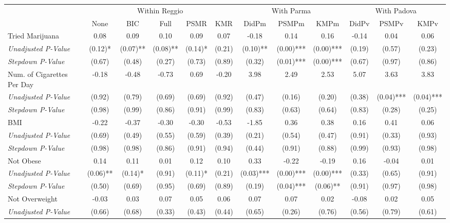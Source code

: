 \begin{tabular}{l c c c c c c c c c c c}
\toprule
& \multicolumn{5}{c}{Within Reggio} & \multicolumn{3}{c}{With Parma} & \multicolumn{3}{c}{With Padova} \\\cmidrule(lr){2-6} \cmidrule(lr){7-9} \cmidrule(lr){10-12}
 & None & BIC & Full & PSMR & KMR & DidPm & PSMPm & KMPm & DidPv & PSMPv & KMPv \\
\midrule
Tried Marijuana & 0.08 & 0.09 & 0.10 & 0.09 & 0.07 & -0.18 & 0.14 & 0.16 & -0.14 & 0.04 & 0.06 \\
\quad \textit{Unadjusted P-Value} & (0.12)* & (0.07)** & (0.08)** & (0.14)* & (0.21) & (0.10)** & (0.00)*** & (0.00)*** & (0.19) & (0.57) & (0.23) \\
\quad \textit{Stepdown P-Value} & (0.67) & (0.48) & (0.27) & (0.73) & (0.89) & (0.32) & (0.01)*** & (0.00)*** & (0.67) & (0.97) & (0.86) \\
Num. of Cigarettes Per Day & -0.18 & -0.48 & -0.73 & 0.69 & -0.20 & 3.98 & 2.49 & 2.53 & 5.07 & 3.63 & 3.83 \\
\quad \textit{Unadjusted P-Value} & (0.92) & (0.79) & (0.69) & (0.69) & (0.92) & (0.47) & (0.16) & (0.20) & (0.38) & (0.04)*** & (0.04)*** \\
\quad \textit{Stepdown P-Value} & (0.98) & (0.99) & (0.86) & (0.91) & (0.99) & (0.83) & (0.63) & (0.64) & (0.83) & (0.28) & (0.25) \\
BMI & -0.22 & -0.37 & -0.30 & -0.30 & -0.53 & -1.85 & 0.36 & 0.38 & 0.16 & 0.41 & 0.06 \\
\quad \textit{Unadjusted P-Value} & (0.69) & (0.49) & (0.55) & (0.59) & (0.39) & (0.21) & (0.54) & (0.47) & (0.91) & (0.33) & (0.93) \\
\quad \textit{Stepdown P-Value} & (0.98) & (0.98) & (0.86) & (0.91) & (0.94) & (0.44) & (0.91) & (0.88) & (0.99) & (0.93) & (0.98) \\
Not Obese & 0.14 & 0.11 & 0.01 & 0.12 & 0.10 & 0.33 & -0.22 & -0.19 & 0.16 & -0.04 & 0.01 \\
\quad \textit{Unadjusted P-Value} & (0.06)** & (0.14)* & (0.91) & (0.11)* & (0.21) & (0.03)*** & (0.00)*** & (0.00)*** & (0.33) & (0.65) & (0.91) \\
\quad \textit{Stepdown P-Value} & (0.50) & (0.69) & (0.95) & (0.69) & (0.89) & (0.19) & (0.04)*** & (0.06)** & (0.91) & (0.97) & (0.98) \\
Not Overweight & -0.03 & 0.03 & 0.07 & 0.05 & 0.06 & 0.07 & 0.07 & 0.02 & -0.08 & 0.02 & 0.05 \\
\quad \textit{Unadjusted P-Value} & (0.66) & (0.68) & (0.33) & (0.43) & (0.44) & (0.65) & (0.26) & (0.76) & (0.56) & (0.79) & (0.61) \\

\end{tabular}
